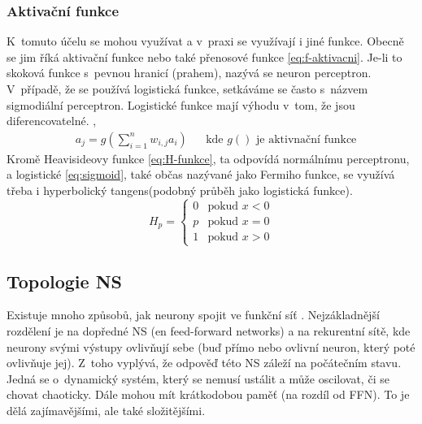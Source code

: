 \documentclass[12pt]{report}			%
\begin{document}
	\subsubsection{Aktivační funkce}
	K~tomuto účelu se mohou využívat a v~praxi se využívají i jiné funkce. Obecně se jim říká aktivační funkce nebo také přenosové funkce \eqref{eq:f-aktivacni}. Je-li to skoková funkce s~pevnou hranicí (prahem), nazývá se neuron perceptron. V~případě, že se používá logistická funkce, setkáváme se často s~názvem sigmodiální perceptron. Logistické funkce mají výhodu v~tom, že jsou diferencovatelné. \parencite[\gls{str} 728-729]{AIAMA}, \parencite[\gls{str} 36]{NN_introduction-Kriessel}\\
	\begin{align}
	\label{eq:f-aktivacni}
	& a_j = g\left(\sum_{i=1}^{n} w_{i,j} a_i\right) && \text{kde $g()$ je aktivnační funkce}
	\end{align}
	Kromě Heavisideovy funkce\parencite{wiki:H-funkce} \eqref{eq:H-funkce}, ta odpovídá normálnímu perceptronu, a logistické \ref{eq:sigmoid}, také občas nazývané jako Fermiho funkce, se využívá třeba i hyperbolický tangens(podobný průběh jako logistická funkce). \parencite[\gls{str} 37-38]{NN_introduction-Kriessel}
	\begin{equation}
	\label{eq:H-funkce}
	 H_p = 
		\begin{cases}
		0 & \text{pokud $x<0$}\\
		p & \text{pokud $x=0$}\\
		1 & \text{pokud $x>0$}
		\end{cases}
	\end{equation}
	\subsection{Topologie \gls{NS}}
	\label{sec:NN-topo}
	Existuje mnoho způsobů, jak neurony spojit ve funkční síť  \parencite{NN-zoo}. Nejzákladnější rozdělení je na dopředné \gls{NS} (\gls{en} feed-forward networks) a na rekurentní sítě, kde neurony svými výstupy ovlivňují sebe (buď přímo nebo ovlivní neuron, který poté ovlivňuje jej). Z~toho vyplývá, že odpověď této \gls{NS} záleží na počátečním stavu. Jedná se o~dynamický systém, který se nemusí ustálit a může oscilovat, či se chovat chaoticky. Dále mohou mít krátkodobou paměť (na rozdíl od \gls{FFN}). To je dělá zajímavějšími, ale také složitějšími. \parencite[\gls{str} 729]{AIAMA}\\
\end{document}
